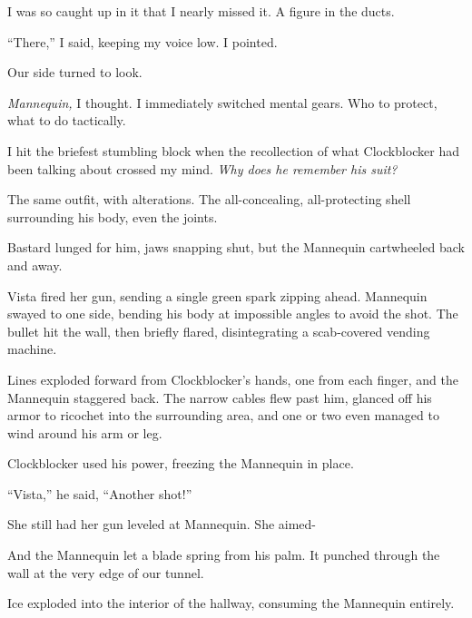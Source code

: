 I was so caught up in it that I nearly missed it.  A figure in the ducts.



``There,'' I said, keeping my voice low.  I pointed.



Our side turned to look.



\emph{Mannequin, }I thought.  I immediately switched mental gears.  Who to protect, what to do tactically.



I hit the briefest stumbling block when the recollection of what Clockblocker had been talking about crossed my mind.  \emph{Why does he remember his suit?}



The same outfit, with alterations.  The all-concealing, all-protecting shell surrounding his body, even the joints.



Bastard lunged for him, jaws snapping shut, but the Mannequin cartwheeled back and away.



Vista fired her gun, sending a single green spark zipping ahead.  Mannequin swayed to one side, bending his body at impossible angles to avoid the shot.  The bullet hit the wall, then briefly flared, disintegrating a scab-covered vending machine.



Lines exploded forward from Clockblocker's hands, one from each finger, and the Mannequin staggered back.  The narrow cables flew past him, glanced off his armor to ricochet into the surrounding area, and one or two even managed to wind around his arm or leg.



Clockblocker used his power, freezing the Mannequin in place.



``Vista,'' he said, ``Another shot!''



She still had her gun leveled at Mannequin.  She aimed-



And the Mannequin let a blade spring from his palm.  It punched through the wall at the very edge of our tunnel.



Ice exploded into the interior of the hallway, consuming the Mannequin entirely.



